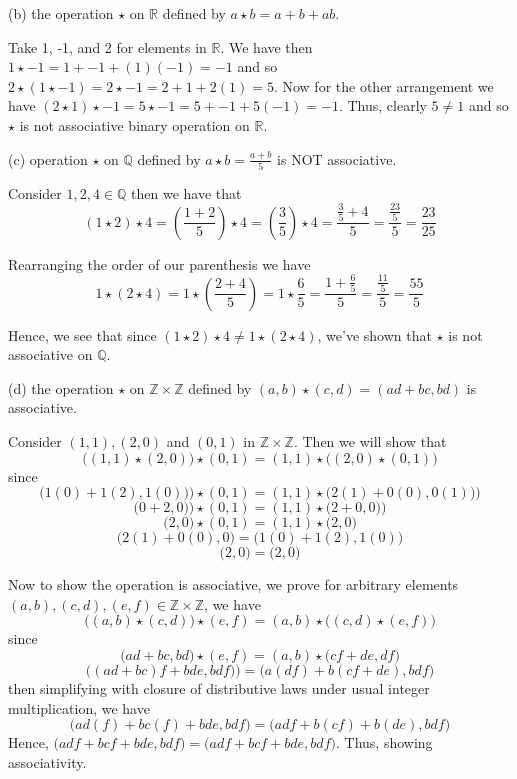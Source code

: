 \documentclass{article}
\begin{document}
(b) the operation $\star$ on $\mathbb{R}$ defined by $a \star b = a+b + ab$.

\noindent Take 1, -1, and 2 for elements in $\mathbb{R}$. 
We have then $ 1\star -1 = 1 + -1 + (1)(-1) = -1$ and so $2\star (1 \star -1) = 2 \star -1 = 2 + 1 + 2(1) = 5 $.  Now for the other arrangement we have $(2\star 1) \star -1 = 5\star -1 = 5 + -1 + 5(-1) = -1$. Thus, clearly $5\ne 1$ and so $\star$ is not associative binary operation on $\mathbb{R}$.

(c) operation $\star$ on $\mathbb{Q}$ defined by $a\star b = \frac{a+b}{5}$ is NOT associative.

\noindent Consider $1,2, 4 \in \mathbb{Q}$ then we have that $$ (1\star 2)\star 4 =  (\frac{1+2}{5}) \star 4 = (\frac{3}{5})\star 4 =   \frac{\frac{3}{5} + 4 }{5} = \frac{\frac{23}{5}}{5} = \frac{23}{25}$$ 

\noindent Rearranging the order of our parenthesis we have  $$ 1\star (2 \star 4) = 1\star (\frac{2+4}{5}) = 1 \star \frac{6}{5} = \frac{1+\frac{6}{5}}{5} =  \frac{\frac{11}{5}}{5} = \frac{55}{5}$$

\noindent Hence, we see that since $ (1\star 2)\star 4 \neq 1\star (2 \star 4) $, we've shown that $\star$ is not associative on $\mathbb{Q}$.

(d) the operation $\star$ on $\mathbb{Z}\times \mathbb{Z}$ defined by $(a,b)\star (c,d) = (ad+bc, bd)$ is associative. 

\noindent Consider $(1,1), (2,0)$ and $(0,1)$ in $\mathbb{Z}\times \mathbb{Z}$.  Then we will show that $$ \bigg ((1,1)\star (2,0)\bigg )\star (0,1) = (1,1)\star \bigg((2,0)\star (0,1)\bigg)$$ since $$ \bigg (1(0)+1(2), 1(0))\bigg )\star (0,1) = (1,1)\star \bigg(2(1)+0(0), 0(1))\bigg) $$
 $$ \bigg (0+2, 0)\bigg )\star (0,1) = (1,1)\star \bigg(2+0, 0)\bigg) $$
 $$ \bigg (2, 0\bigg )\star (0,1) = (1,1)\star \bigg(2, 0\bigg) $$
 $$ \bigg (2(1)+0(0), 0\bigg ) = \bigg(1(0)+1(2), 1(0)\bigg) $$
 $$ \bigg (2, 0\bigg ) = \bigg(2, 0\bigg) $$
 
 \noindent Now to show the operation is associative, we prove for arbitrary elements $(a,b), (c,d), (e,f) \in \mathbb{Z}\times \mathbb{Z}$, we have  $$ \bigg ((a,b)\star (c,d)\bigg )\star (e,f) = (a,b)\star \bigg((c,d)\star (e,f)\bigg)$$ since $$ \bigg (ad+bc, bd \bigg )\star (e,f) = (a,b)\star \bigg(cf+de, df \bigg) $$
 $$ \bigg ((ad+bc)f+bde, bdf)\bigg)  = \bigg(a(df)+b(cf+de), bdf \bigg) $$ 
 then simplifying with closure of distributive laws under usual integer multiplication, we have  $$ \bigg (ad(f)+bc(f)+bde, bdf \bigg ) = \bigg(adf+b(cf)+b(de), bdf \bigg) $$ Hence, 
 $ \bigg (adf+bcf+bde, bdf \bigg ) = \bigg(adf+bcf+bde, bdf\bigg) $.
 Thus, showing associativity.
 
\end{document}
